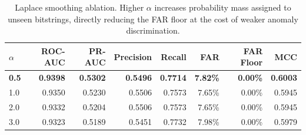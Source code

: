 \begin{table}[htbp]
\centering
\caption{Laplace smoothing ablation. Higher $\alpha$ increases probability mass assigned to unseen bitstrings, directly reducing the FAR floor at the cost of weaker anomaly discrimination.}
\label{tab:laplace_sweep}
\begin{tabular}{lrrrrrrr}
\toprule
\textbf{$\alpha$} & \textbf{ROC-AUC} & \textbf{PR-AUC} & \textbf{Precision} & \textbf{Recall} & \textbf{FAR} & \textbf{FAR Floor} & \textbf{MCC} \\
\midrule
\textbf{0.5} & \textbf{0.9398} & \textbf{0.5302} & \textbf{0.5496} & \textbf{0.7714} & \textbf{7.82\%} & \textbf{0.00\%} & \textbf{0.6003} \\
1.0 & 0.9350 & 0.5230 & 0.5506 & 0.7573 & 7.65\% & 0.00\% & 0.5945 \\
2.0 & 0.9332 & 0.5204 & 0.5506 & 0.7573 & 7.65\% & 0.00\% & 0.5945 \\
3.0 & 0.9323 & 0.5189 & 0.5451 & 0.7732 & 7.98\% & 0.00\% & 0.5979 \\
\bottomrule
\end{tabular}
\end{table}